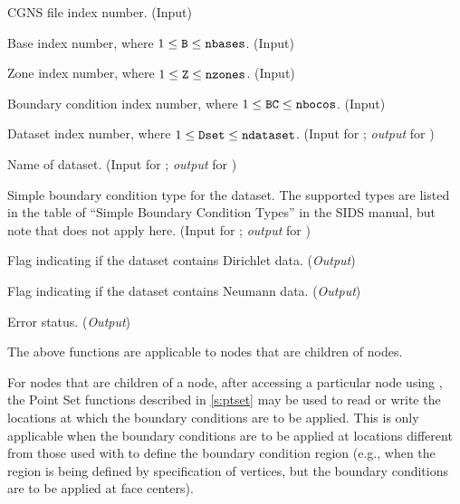 \begin{Ventryi}{}\raggedright
\item [\fort{fn}]
      CGNS file index number.
      (\textcolor{input}{Input})
\item [\fort{B}]
      Base index number, where $1 \leq \text{{\normalfont\texttt{B}}} \leq \text{{\normalfont\texttt{nbases}}}$.
      (\textcolor{input}{Input})
\item [\fort{Z}]
      Zone index number, where $1 \leq \text{{\normalfont\texttt{Z}}} \leq \text{{\normalfont\texttt{nzones}}}$.
      (\textcolor{input}{Input})
\item [\fort{BC}]
      Boundary condition index number, where $1 \leq \text{{\normalfont\texttt{BC}}} \leq \text{{\normalfont\texttt{nbocos}}}$.
      (\textcolor{input}{Input})
\item [\fort{Dset}]
      Dataset index number, where $1 \leq \text{{\normalfont\texttt{Dset}}} \leq \text{{\normalfont\texttt{ndataset}}}$.
      (\textcolor{input}{Input} for ;
      \textcolor{output}{\textit{output}} for )
\item [\fort{DatasetName}]
      Name of dataset.
      (\textcolor{input}{Input} for ;
      \textcolor{output}{\textit{output}} for )
\item [\fort{BCType}]
      Simple boundary condition type for the dataset.
      The supported types are listed in the table of ``Simple
      Boundary Condition Types'' in the SIDS manual, but note that
       does not apply here.
      (\textcolor{input}{Input} for ;
      \textcolor{output}{\textit{output}} for )
\item [\fort{DirichletFlag}]
      Flag indicating if the dataset contains Dirichlet data.
      (\textcolor{output}{\textit{Output}})
\item [\fort{NeumannFlag}]
      Flag indicating if the dataset contains Neumann data.
      (\textcolor{output}{\textit{Output}})
\item [\fort{ier}]
      Error status.
      (\textcolor{output}{\textit{Output}})
\end{Ventryi}

The above functions are applicable to  nodes
that are children of  nodes.

For  nodes that are children of a 
node, after accessing a particular  node using
, the Point Set functions described in \autoref{s:ptset}
may be used to read or write the locations at which the boundary
conditions are to be applied.
This is only applicable when the boundary conditions are to be applied
at locations different from those used with  to
define the boundary condition region (e.g., when the region is being
defined by specification of vertices, but the boundary conditions are to
be applied at face centers).

